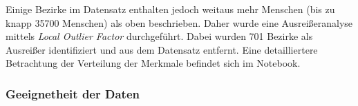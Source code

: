 \documentclass[11pt]{scrartcl}
\begin{document}
	\begin{table}[h]
		\centering
		\small
		\caption{Die Ausprägungen der Merkmale für die ersten fünf Bezirke aus dem Datensatz.}
		\label{tab:datensatz_head}
	\end{table}
	Einige Bezirke im Datensatz enthalten jedoch
	weitaus mehr Menschen (bis zu knapp 35700 Menschen) als oben beschrieben. Daher wurde eine Ausreißeranalyse
	mittels \textit{Local Outlier Factor} durchgeführt. Dabei wurden 701 Bezirke als Ausreißer identifiziert und aus dem Datensatz entfernt. Eine detailliertere Betrachtung der Verteilung der Merkmale befindet sich im Notebook.
	
	\subsubsection*{Geeignetheit der Daten}
	
\end{document}
